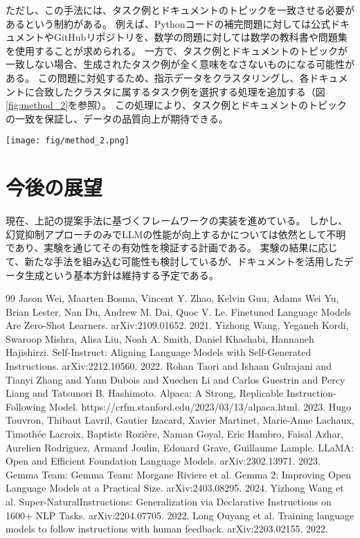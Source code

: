 \documentclass[twocolumn]{jsarticle}
\begin{document}
ただし、この手法には、タスク例とドキュメントのトピックを一致させる必要があるという制約がある。
例えば、Pythonコードの補完問題に対しては公式ドキュメントやGitHubリポジトリを、数学の問題に対しては数学の教科書や問題集を使用することが求められる。
一方で、タスク例とドキュメントのトピックが一致しない場合、生成されたタスク例が全く意味をなさないものになる可能性がある。
この問題に対処するため、指示データをクラスタリングし、各ドキュメントに合致したクラスタに属するタスク例を選択する処理を追加する（図\ref{fig:method_2}を参照）。
この処理により、タスク例とドキュメントのトピックの一致を保証し、データの品質向上が期待できる。
\begin{figure*}[t]
    \centering
    \texttt{[image: fig/method\_2.png]}
    \caption{データのクラスタリング}
    \label{fig:method_2}
\end{figure*}


\section{今後の展望}
現在、上記の提案手法に基づくフレームワークの実装を進めている。
しかし、幻覚抑制アプローチのみでLLMの性能が向上するかについては依然として不明であり、実験を通じてその有効性を検証する計画である。
実験の結果に応じて、新たな手法を組み込む可能性も検討しているが、ドキュメントを活用したデータ生成という基本方針は維持する予定である。


\begin{thebibliography}{99}
    Jason Wei, Maarten Bosma, Vincent Y. Zhao, Kelvin Guu, Adams Wei Yu, Brian Lester, Nan Du, Andrew M. Dai, Quoc V. Le. Finetuned Language Models Are Zero-Shot Learners. arXiv:2109.01652. 2021.
    Yizhong Wang, Yeganeh Kordi, Swaroop Mishra, Alisa Liu, Noah A. Smith, Daniel Khashabi, Hannaneh Hajishirzi. Self-Instruct: Aligning Language Models with Self-Generated Instructions. arXiv:2212.10560. 2022.
    Rohan Taori and Ishaan Gulrajani and Tianyi Zhang and Yann Dubois and Xuechen Li and Carlos Guestrin and Percy Liang and Tatsunori B. Hashimoto. Alpaca: A Strong, Replicable Instruction-Following Model. https://crfm.stanford.edu/2023/03/13/alpaca.html. 2023.
    Hugo Touvron, Thibaut Lavril, Gautier Izacard, Xavier Martinet, Marie-Anne Lachaux, Timothée Lacroix, Baptiste Rozière, Naman Goyal, Eric Hambro, Faisal Azhar, Aurelien Rodriguez, Armand Joulin, Edouard Grave, Guillaume Lample. LLaMA: Open and Efficient Foundation Language Models. arXiv:2302.13971. 2023.
    Gemma Team: Gemma Team: Morgane Riviere et al. Gemma 2: Improving Open Language Models at a Practical Size. arXiv:2403.08295. 2024.
    Yizhong Wang et al. Super-NaturalInstructions: Generalization via Declarative Instructions on 1600+ NLP Tasks. arXiv:2204.07705. 2022.
    Long Ouyang et al. Training language models to follow instructions with human feedback. arXiv:2203.02155. 2022.
\end{thebibliography}
\end{document}
